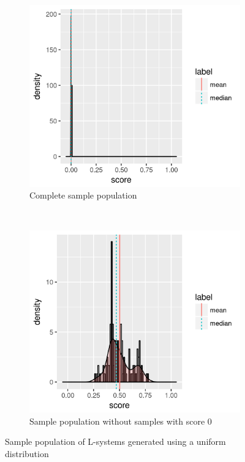 \begin{figure}
    \centering
    \begin{subfigure}{0.48\textwidth}
        \includegraphics[width=\textwidth]{figures/uniform-population}
        \caption{Complete sample population}
        \label{fig:uniform-population}
    \end{subfigure}
    ~
    \begin{subfigure}{0.48\textwidth}
        \includegraphics[width=\textwidth]{figures/uniform-population-no0}
        \caption{Sample population without samples with score 0}
        \label{fig:uniform-population-no0}
    \end{subfigure}
    \caption{Sample population of L-systems generated using a uniform distribution}
\end{figure}

